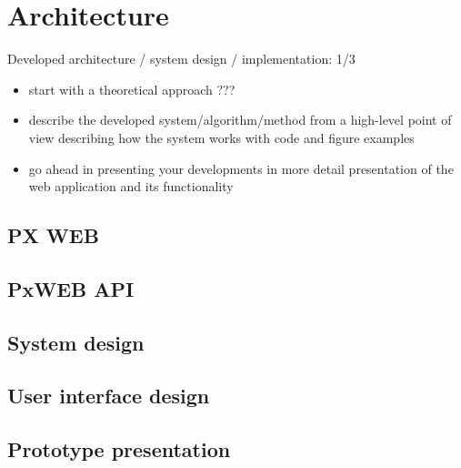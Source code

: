 \chapter{Architecture}
Developed architecture / system design / implementation: 1/3

\begin{itemize}
	\item start with a theoretical approach
	      ???
	\item describe the developed system/algorithm/method from a high-level point of view
	      describing how the system works with code and figure examples
	\item go ahead in presenting your developments in more detail
	      presentation of the web application and its functionality
\end{itemize}

\section{PX WEB}

\section{PxWEB API}
\section{System design}
\section{User interface design}
\section{Prototype presentation}